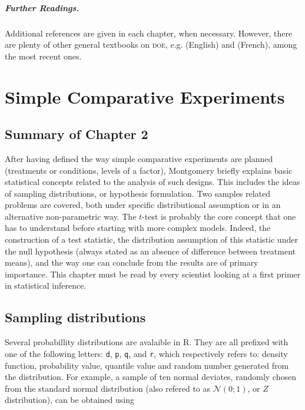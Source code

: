 \documentclass[11pt,a4paper]{memoir}\usepackage[]{graphicx}\usepackage[]{color}
\newcommand{\R}{\textsf{R}}
\begin{document}
\paragraph{Further Readings.}
Additional references are given in each chapter, when
necessary. However, there are plenty of other general textbooks
on \textsc{doe},
e.g. \autocite{Hinkelmann:2005,Christensen:2002,Faraway:2005} (English) and
\autocite{Benoist:1994,Dagnelie:2003,Goupy:2004,Azais:2005} (French),
among the most recent ones.


\chapter{Simple Comparative Experiments}
\label{cha:simple-comp-exper}

\section{Summary of Chapter 2}
\label{sec:summary-chapter-2}
After having defined the way simple comparative experiments are planned
(treatments or conditions, levels of a factor), Montgomery briefly explains
basic statistical concepts related to the analysis of such
designs. This includes the ideas of sampling distributions, or hypothesis
formulation. Two samples related problems are covered, both under
specific distributional assumption or in an alternative non-parametric
way. The $t$-test is probably the core concept that one has to
understand before starting with more complex models. Indeed, the
construction of a test statistic, the distribution assumption of this
statistic under the null hypothesis (always stated as an absence of
difference between treatment means), and the way one can conclude from
the results are of primary importance. This chapter must be read by
every scientist looking at a first primer in statistical inference.

\section{Sampling distributions}
\label{sec:sampl-distr}
Several probabillity distributions are avalaible in \R. They are all
prefixed with one of the following letters: \texttt{d}, \texttt{p},
\texttt{q}, and \texttt{r}, which respectively refers to: density function,
probability value, quantile value and random number generated from the
distribution. For example, a sample of ten normal deviates, randomly chosen
from the standard normal distribution (also refered to as
$\mathcal{N}(0;1)$, or $Z$ distribution), can be obtained using
\end{document}

